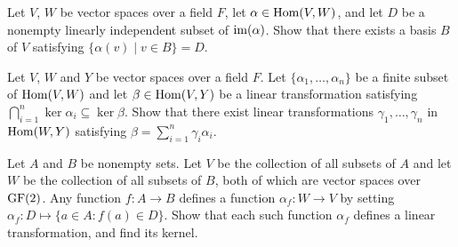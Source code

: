 \probskip

\begin{problem}[Golan 296]\hskip-2mm\protect\footnotemark
\label{prob:296}
Let $V$, $W$ be vector spaces over a field $F$, let 
$\alpha \in \operatorname{Hom}(V, W)$, and let $D$ be a nonempty linearly independent subset
of $\operatorname{im}(\alpha)$.  Show that there exists a basis $B$ of $V$ satisfying
$\{\alpha(v)\mid v \in B\} = D$.
\end{problem}

\probskip

\begin{problem}[Golan 306]
Let $V$, $W$ and $Y$ be vector spaces over a field $F$.  Let 
$\{\alpha_1, \dots, \alpha_n\}$ be a finite subset of $\operatorname{Hom}(V, W)$
and let $\beta \in \operatorname{Hom}(V,Y)$ be a linear transformation satisfying
$\bigcap_{i=1}^n \ker{\alpha_i} \subseteq \ker{\beta}$.  Show that there exist
linear transformations $\gamma_1, \dots, \gamma_n$ in $\operatorname{Hom}(W,Y)$ satisfying
$\beta = \sum_{i=1}^n \gamma_i \alpha_i$.
\end{problem}

\probskip

\begin{problem}[Golan 266]
Let $A$ and $B$ be nonempty sets.  Let $V$ be the collection of all subsets of
$A$ and let $W$ be the collection of all subsets of $B$, both of which are
vector spaces over $\operatorname{GF}(2)$.  Any function $f: A\rightarrow B$ defines a
function $\alpha_f : W \rightarrow V$ by setting 
$\alpha_f: D \mapsto \{a \in A : f(a) \in D\}$.  Show that each such function
$\alpha_f$ defines a linear transformation, and find its kernel.
\end{problem}


%
%



